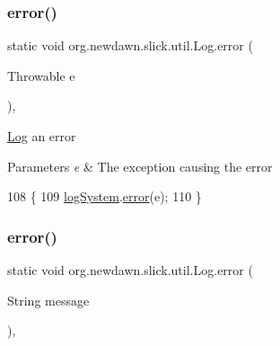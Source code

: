\subsubsection{\texorpdfstring{error()}{error()}\hspace{0.1cm}{\footnotesize\ttfamily [2/3]}}
{\footnotesize\ttfamily static void org.\+newdawn.\+slick.\+util.\+Log.\+error (\begin{DoxyParamCaption}\item[{Throwable}]{e }\end{DoxyParamCaption})\hspace{0.3cm}{\ttfamily [inline]}, {\ttfamily [static]}}

\mbox{\hyperlink{classorg_1_1newdawn_1_1slick_1_1util_1_1_log}{Log}} an error


\begin{DoxyParams}{Parameters}
{\em e} & The exception causing the error \\
\hline
\end{DoxyParams}

\begin{DoxyCode}
108                                           \{
109         \mbox{\hyperlink{classorg_1_1newdawn_1_1slick_1_1util_1_1_log_acca32268a2a183e671051b4b9188cc72}{logSystem}}.\mbox{\hyperlink{interfaceorg_1_1newdawn_1_1slick_1_1util_1_1_log_system_a9ba18920fcc1e6b04324a1b9dfb40640}{error}}(e);
110     \}
\end{DoxyCode}
\mbox{\label{classorg_1_1newdawn_1_1slick_1_1util_1_1_log_a5c6d71feeab34353e0c70b9899cfbf78}} 
\subsubsection{\texorpdfstring{error()}{error()}\hspace{0.1cm}{\footnotesize\ttfamily [3/3]}}
{\footnotesize\ttfamily static void org.\+newdawn.\+slick.\+util.\+Log.\+error (\begin{DoxyParamCaption}\item[{String}]{message }\end{DoxyParamCaption})\hspace{0.3cm}{\ttfamily [inline]}, {\ttfamily [static]}}

